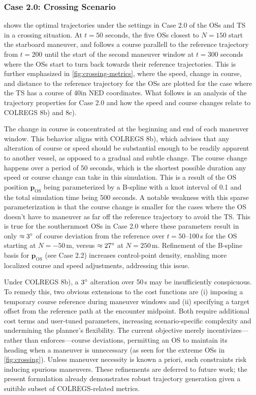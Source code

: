 \subsubsection{Case 2.0: Crossing Scenario}
 shows the optimal trajectories under the settings in Case 2.0 of the OSs and TS in a crossing situation. At $t=50$ seconds, the five OSs closest to $N=150$ start the starboard maneuver, and follows a course parallell to the reference trajectory from $t=200$ until the start of the second maneuver window at $t=300$ seconds where the OSs start to turn back towards their reference trajectories. This is further emphasized in \cref{fig:crossing-metrics}, where the speed, change in course, and distance to the reference trajectory for the OSs are plotted for the case where the TS has a course of 40\degree in \gls{NED} coordinates. What follows is an analysis of the trajectory properties for Case 2.0 and how the speed and course changes relate to COLREGS 8b) and 8c).

The change in course is concentrated at the beginning and end of each maneuver window. This behavior aligns with COLREGS 8b), which advises that any alteration of course or speed should be substantial enough to be readily apparent to another vessel, as opposed to a gradual and subtle change.  The course change happens over a period of 50 seconds, which is the shortest possible duration any speed or course change can take in this simulation. This is a result of the OS position $\mathbf p_\text{OS}$ being parameterized by a B-spline with a knot interval of 0.1 and the total simulation time being 500 seconds. A notable weakness with this sparse parameterization is that the course change is smaller for the cases where the OS doesn't have to maneuver as far off the reference trajectory to avoid the TS. 
This is true for the southernmost OSs in Case 2.0 where these parameters result in only $\approx3\degree$ of course deviation from the reference over $t=50$–100\,s for the OS starting at $N=-50\,$m, versus $\approx27\degree$ at $N=250\,$m. Refinement of the B-spline basis for $\mathbf p_\text{OS}$ (see Case 2.2) increases control-point density, enabling more localized course and speed adjustments, addressing this issue.

Under COLREGS 8b), a $3\degree$ alteration over 50\,s  may be insufficiently conspicuous. To remedy this, two obvious extensions to the cost functions are (i) imposing a temporary course reference during maneuver windows and (ii) specifying a target offset from the reference path at the encounter midpoint. Both require additional cost terms and user‐tuned parameters, increasing scenario‐specific complexity and undermining the planner’s flexibility. The current objective merely incentivizes---rather than enforces---course deviations, permitting an OS to maintain its heading when a maneuver is unnecessary (as seen for the extreme OSs in \cref{fig:crossing}). Unless maneuver necessity is known a priori, such constraints risk inducing spurious maneuvers. These refinements are deferred to future work; the present formulation already demonstrates robust trajectory generation given a suitible subset of COLREGS‐related metrics.


